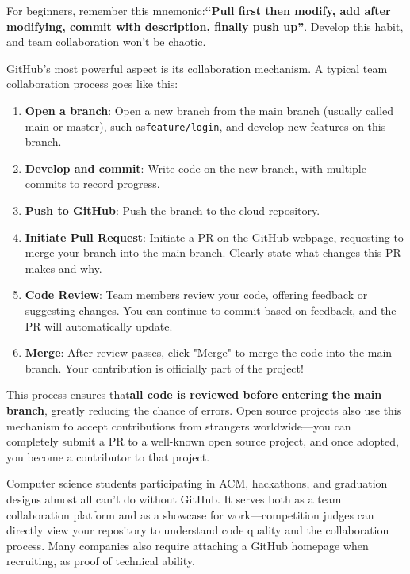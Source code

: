 For beginners, remember this mnemonic:\textbf{“Pull first then modify, add after modifying, commit with description, finally push up”}. Develop this habit, and team collaboration won't be chaotic.


GitHub's most powerful aspect is its collaboration mechanism. A typical team collaboration process goes like this:

\begin{enumerate}
  \item \textbf{Open a branch}: Open a new branch from the main branch (usually called main or master), such as\texttt{feature/\allowbreak login}, and develop new features on this branch.
  \item \textbf{Develop and commit}: Write code on the new branch, with multiple commits to record progress.
  \item \textbf{Push to GitHub}: Push the branch to the cloud repository.
  \item \textbf{Initiate Pull Request}: Initiate a PR on the GitHub webpage, requesting to merge your branch into the main branch. Clearly state what changes this PR makes and why.
  \item \textbf{Code Review}: Team members review your code, offering feedback or suggesting changes. You can continue to commit based on feedback, and the PR will automatically update.
  \item \textbf{Merge}: After review passes, click "Merge" to merge the code into the main branch. Your contribution is officially part of the project!
\end{enumerate}

This process ensures that\textbf{all code is reviewed before entering the main branch}, greatly reducing the chance of errors. Open source projects also use this mechanism to accept contributions from strangers worldwide—you can completely submit a PR to a well-known open source project, and once adopted, you become a contributor to that project.



Computer science students participating in ACM, hackathons, and graduation designs almost all can't do without GitHub. It serves both as a team collaboration platform and as a showcase for work—competition judges can directly view your repository to understand code quality and the collaboration process. Many companies also require attaching a GitHub homepage when recruiting, as proof of technical ability.

